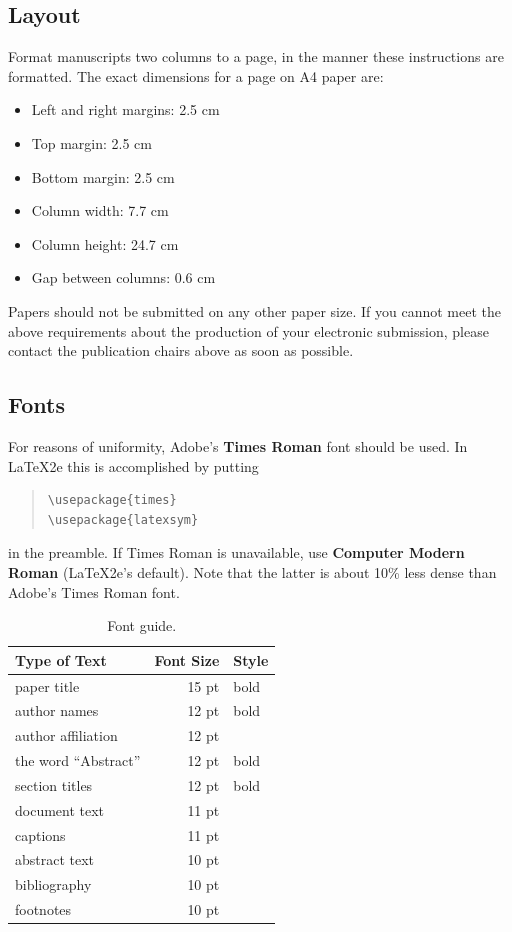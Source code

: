 \documentclass[11pt]{article}
\begin{document}
\subsection{Layout}
\label{ssec:layout}

Format manuscripts two columns to a page, in the manner these
instructions are formatted. The exact dimensions for a page on A4
paper are:

\begin{itemize}
\item Left and right margins: 2.5 cm
\item Top margin: 2.5 cm
\item Bottom margin: 2.5 cm
\item Column width: 7.7 cm
\item Column height: 24.7 cm
\item Gap between columns: 0.6 cm
\end{itemize}

\noindent Papers should not be submitted on any other paper size.
 If you cannot meet the above requirements about the production of your electronic submission, please contact the publication chairs above as soon as possible.


\subsection{Fonts}

For reasons of uniformity, Adobe's {\bf Times Roman} font should be
used. In \LaTeX2e{} this is accomplished by putting

\begin{quote}
\begin{verbatim}
\usepackage{times}
\usepackage{latexsym}
\end{verbatim}
\end{quote}
in the preamble. If Times Roman is unavailable, use {\bf Computer
  Modern Roman} (\LaTeX2e{}'s default).  Note that the latter is about
  10\% less dense than Adobe's Times Roman font.


\begin{table}[h]
\begin{center}
\begin{tabular}{|l|rl|}
\hline \bf Type of Text & \bf Font Size & \bf Style \\ \hline
paper title & 15 pt & bold \\
author names & 12 pt & bold \\
author affiliation & 12 pt & \\
the word ``Abstract'' & 12 pt & bold \\
section titles & 12 pt & bold \\
document text & 11 pt  &\\
captions & 11 pt & \\
abstract text & 10 pt & \\
bibliography & 10 pt & \\
footnotes & 10 pt & \\
\hline
\end{tabular}
\end{center}
\caption{\label{font-table} Font guide. }
\end{table}
\end{document}
